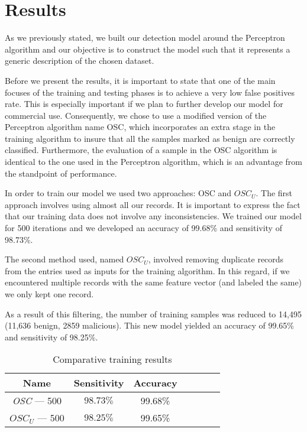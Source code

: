 \section{Results}
\par
As we previously stated, we built our detection model around the Perceptron algorithm and our objective is to construct the model such that it represents a generic description of the chosen dataset.
\par
Before we present the results, it is important to state that one of the main focuses of the training and testing phases is to achieve a very low false positives rate. This is especially important if we plan to further develop our model for commercial use. Consequently, we chose to use a modified version of the Perceptron algorithm name OSC, which incorporates an extra stage in the training algorithm to insure that all the samples marked as benign are correctly classified. Furthermore, the evaluation of a sample in the OSC algorithm is identical to the one used in the Perceptron algorithm, which is an advantage from the standpoint of performance.
\par
In order to train our model we used two approaches: OSC and $OSC_{U}$. The first approach involves using almost all our records. It is important to express the fact that our training data does not involve any inconsistencies. We trained our model for 500 iterations and we developed an accuracy of 99.68\% and sensitivity of 98.73\%. 
\par
The second method used, named $OSC_{U}$,  involved removing duplicate records from the entries used as inputs for the training algorithm. In this regard, if we encountered multiple records with the same feature vector (and labeled the same) we only kept one record.
\par
As a result of this filtering, the number of training samples was reduced to 14,495 (11,636 benign, 2859 malicious). This new model yielded an accuracy of 99.65\% and sensitivity of 98.25\%.
\begin{table}[ht]
    \centering
    \begin{tabular}{| c | c | c | c | c | c | c | }
    \hline
    Name & Sensitivity & Accuracy\\ \hline
    \textit{OSC} --- 500 & $98.73\%$ &  99.68\% \\ \hline
    \textit{$OSC_{U}$} --- 500 & $98.25\%$ &  99.65\% \\ \hline
    \end{tabular}
    \caption{Comparative training results} 
    \label{tab:trainingresults}
\end{table}
